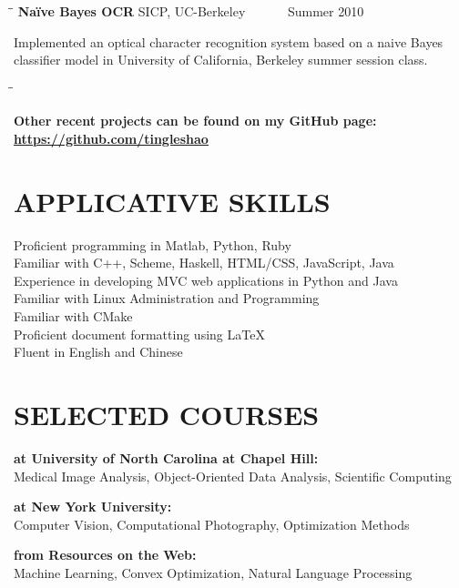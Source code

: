 \documentclass{res}
\begin{document}
\begin{resume}
      \begin{tabbing}%
   \hspace{2.3in}\= \hspace{2.6in}\= \kill %
   {\bf Na\"{i}ve Bayes OCR}  \>SICP, UC-Berkeley\> ~~~~~~Summer 2010\\
   \end{tabbing}\vspace{-20pt}
    Implemented an optical character recognition system based on a naive Bayes classifier model in University of California, Berkeley summer session class.
    \begin{tabbing}
   \hspace{2.3in}\= \hspace{2.6in}\= \kill %

    {\bf Other recent projects can be found on my GitHub page: \href{https://github.com/tingleshao}{\underline{https://github.com/tingleshao}}}
  \end{tabbing}

\section{APPLICATIVE SKILLS}
    \vspace{0.05in}
    Proficient programming in Matlab, Python, Ruby  \\
    Familiar with C++, Scheme, Haskell, HTML/CSS, JavaScript, Java\\
    Experience in developing MVC web applications in Python and Java\\
    Familiar with Linux Administration and Programming \\
    Familiar with CMake\\
    Proficient document formatting using \LaTeX \\
    Fluent in English and Chinese

\section{SELECTED COURSES}
     \vspace{-0.05in}	
    \begin{tabbing}
    {\bf at University of North Carolina at Chapel Hill:}\\
    Medical Image Analysis, Object-Oriented Data Analysis, Scientific Computing \\
    \end{tabbing}\vspace{-30pt}
         \begin{tabbing}
    {\bf at New York University:}\\
    Computer Vision, Computational Photography, Optimization Methods\\
        \end{tabbing}\vspace{-30pt}
         \begin{tabbing}
    {\bf from Resources on the Web:}\\
    Machine Learning, Convex Optimization, Natural Language Processing
            \end{tabbing}



\end{resume}
\end{document}
